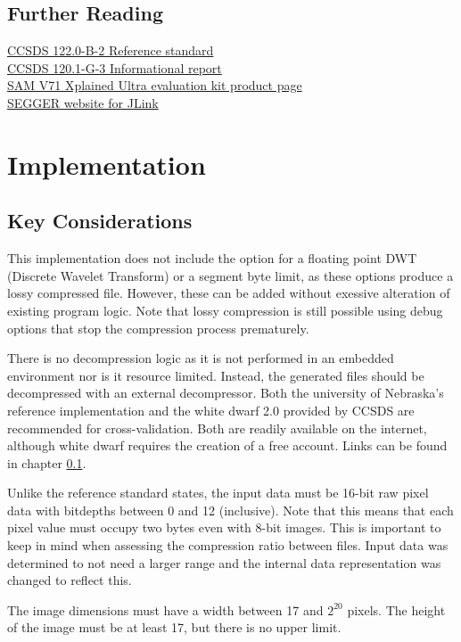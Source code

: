 \documentclass[12pt, a4paper]{article}
\begin{document}
\subsection{Further Reading}
\label{links}
\href{https://public.ccsds.org/Pubs/122x0b2.pdf}{CCSDS 122.0-B-2 Reference standard} \\
\href{https://public.ccsds.org/Pubs/120x1g3.pdf}{CCSDS 120.1-G-3 Informational report} \\
\href{https://www.microchip.com/en-us/development-tool/atsamv71-xult}{SAM V71 Xplained Ultra evaluation kit product page} \\
\href{https://www.segger.com/downloads/jlink/}{SEGGER website for JLink}

\newpage
\section{Implementation}
\subsection{Key Considerations}
This implementation does not include the option for a floating point 
DWT (Discrete Wavelet Transform) or a segment byte limit, 
as these options produce a lossy compressed file.
However, these can be added without exessive alteration of existing program logic.
Note that lossy compression is still possible using debug options that 
stop the compression process prematurely. 

\medskip
\noindent
There is no decompression logic as it is not performed in an embedded environment nor is it resource limited. 
Instead, the generated files should be decompressed with an external decompressor.
Both the university of Nebraska's reference implementation and the white dwarf 2.0 provided by CCSDS are 
recommended for cross-validation. Both are readily available on the internet, 
although white dwarf requires the creation of a free account. 
Links can be found in chapter \ref{links}.

\medskip
\noindent
Unlike the reference standard states, the input data must be 16-bit raw pixel data with bitdepths between 0 and 12 (inclusive). 
Note that this means that each pixel value must occupy two bytes even with 8-bit images. 
This is important to keep in mind when assessing the compression ratio between files. 
Input data was determined to not need a larger range and the internal data representation was changed to reflect this.

\medskip
\noindent
The image dimensions must have a width between 17 and \(2^{20}\) pixels. 
The height of the image must be at least 17, but there is no upper limit.
\end{document}

